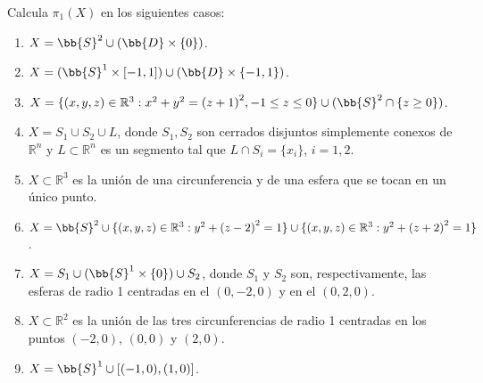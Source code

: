 \begin{ejercicio}
    Calcula $\pi_1(X)$ en los siguientes casos:
    \begin{enumerate}[label=\alph*)]
        \item $X=\bb{S}^2 \cup (\bb{D}\times \{0\})$.
        \item $X=(\bb{S}^1 \times [-1,1])\cup (\bb{D}\times \{-1,1\})$.
        \item $X = \{(x,y,z)\in \mathbb{R}^3 : x^2+y^2 = {(z+1)}^{2}, -1\leq z\leq 0\}\cup (\bb{S}^2 \cap \{z\geq 0\})$.
        \item $X = S_1 \cup S_2 \cup L$, donde $S_1,S_2$ son cerrados disjuntos simplemente conexos de $\mathbb{R}^n$ y $L\subset \mathbb{R}^n$ es un segmento tal que $L\cap S_i =\{x_i\}$, $i = 1,2$.
        \item $X\subset \mathbb{R}^3$ es la unión de una circunferencia y de una esfera que se tocan en un único punto.
        \item $X = \bb{S}^2\cup \{(x,y,z)\in \mathbb{R}^3 : y^2 + {(z-2)}^{2} = 1\}\cup \{(x,y,z)\in \mathbb{R}^3 : y^2 + {(z+2)}^{2}=1\}$.
        \item $X = S_1 \cup (\bb{S}^1 \times \{0\})\cup S_2$, donde $S_1$ y $S_2$ son, respectivamente, las esferas de radio 1 centradas en el $(0,-2,0)$ y en el $(0,2,0)$.
        \item $X\subset \mathbb{R}^2$ es la unión de las tres circunferencias de radio 1 centradas en los puntos $(-2,0)$, $(0,0)$ y $(2,0)$.
        \item $X = \bb{S}^1\cup [(-1,0), (1,0)]$.
    \end{enumerate}
\end{ejercicio}

